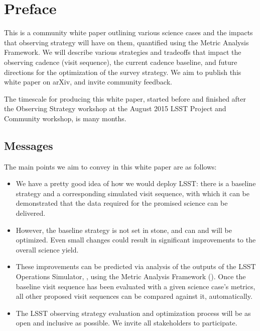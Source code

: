 \setcounter{chapter}{0}
\chapter*{Preface}
\def\chpname{preface}\label{chp:\chpname}
\markboth{}{}

\noindent This is a community white paper outlining various science
cases and the impacts that observing strategy will have on them,
quantified using the Metric Analysis Framework. We will describe
various strategies and tradeoffs that impact the observing cadence
(visit sequence), the current cadence baseline, and future directions
for the optimization of the survey strategy. We aim to publish this
white paper on arXiv, and invite community feedback.

The timescale for producing this white paper, started before and
finished after the Observing Strategy workshop at the  August 2015
LSST Project and Community workshop, is many months.


\section*{Messages}

The main points we aim to convey in this white paper are as follows:

\begin{itemize}

    \item We have a pretty good idea of how we would deploy LSST:
    there is a baseline strategy and a corresponding  simulated visit
    sequence, with which it can be demonstrated that the data required
    for the promised science can be delivered.

    \item However, the baseline strategy is not set in stone, and
    can and will be optimized. Even small changes could
    result in significant improvements to the overall science yield.

    \item These improvements can be predicted via analysis of the
    outputs of the LSST Operations Simulator, \OpSim, using the
    Metric Analysis Framework (\MAF). Once the baseline visit sequence
    has been evaluated with a given science case's metrics, all other
    proposed visit sequences can be compared against it, automatically.

    \item The LSST observing strategy evaluation and optimization
    process will be as open and inclusive as possible. We invite all
    stakeholders to participate.

\end{itemize}

